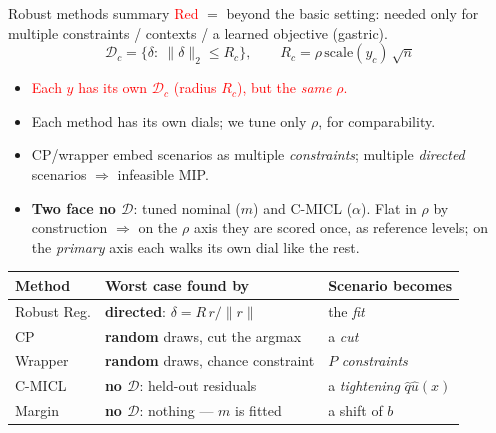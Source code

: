 \documentclass{beamer}
\newcommand{\mc}[1]{\textcolor{red}{#1}}
\begin{document}
\begin{frame}{Robust methods summary}
  \small
  {\footnotesize\mc{Red} $=$ beyond the basic setting: needed only for multiple
  constraints / contexts / a learned objective (gastric).}
  \[
    \mathcal D_c = \{\delta:\ \lVert\delta\rVert_2\le R_c\},
    \qquad R_c = \rho\,\mathrm{scale}(y_c)\,\sqrt n
  \]
  \begin{itemize}
    \item \mc{Each $y$ has its own $\mathcal D_c$ (radius $R_c$), but the \emph{same} $\rho$.}
    \item Each method has its own dials; we tune only $\rho$, for comparability.
    \item CP/wrapper embed scenarios as multiple \emph{constraints};
      multiple \emph{directed} scenarios $\Rightarrow$ infeasible MIP.
    \item \textbf{Two face no $\mathcal D$}: tuned nominal ($m$) and C-MICL
      ($\alpha$). Flat in $\rho$ by construction $\Rightarrow$ on the $\rho$ axis
      they are scored once, as reference levels; on the \emph{primary} axis each
      walks its own dial like the rest.
  \end{itemize}
  \begin{center}\small
  \begin{tabular}{@{}lll@{}}
    \toprule
    Method & Worst case found by & Scenario becomes \\
    \midrule
    Robust Reg. & \textbf{directed}: $\delta = R\,r/\lVert r\rVert$ & the \emph{fit} \\
    CP          & \textbf{random} draws, cut the argmax  & a \emph{cut} \\
    Wrapper     & \textbf{random} draws, chance constraint & $P$ \emph{constraints} \\
    C-MICL      & \textbf{no $\mathcal D$}: held-out residuals & a \emph{tightening} $\hat q\hat u(x)$ \\
    Margin      & \textbf{no $\mathcal D$}: nothing --- $m$ is fitted & a shift of $b$ \\
    \bottomrule
  \end{tabular}
  \end{center}
\end{frame}
\end{document}
